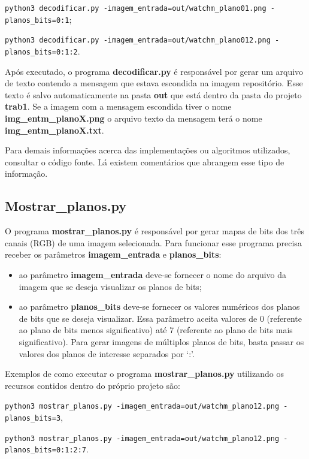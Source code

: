 \documentclass{article}
\begin{document}
\lstinline{python3 decodificar.py -imagem_entrada=out/watchm_plano01.png -planos_bits=0:1};

\lstinline{python3 decodificar.py -imagem_entrada=out/watchm_plano012.png -planos_bits=0:1:2}.

\noindent
Após executado, o programa \textbf{decodificar.py} é responsável por gerar um arquivo de texto contendo a mensagem que estava escondida na imagem repositório. Esse texto é salvo automaticamente na pasta \textbf{out} que está dentro da pasta do projeto \textbf{trab1}. Se a imagem com a mensagem escondida tiver o nome \textbf{img\_entm\_planoX.png} o arquivo texto da mensagem terá o nome \textbf{img\_entm\_planoX.txt}.

Para demais informações acerca das implementações ou algoritmos utilizados, consultar o código fonte. Lá existem comentários que abrangem esse tipo de informação.

%
\subsection{Mostrar\_planos.py}
O programa \textbf{mostrar\_planos.py} é responsável por gerar mapas de bits dos três canais (RGB) de uma imagem selecionada. Para funcionar esse programa precisa receber os parâmetros \textbf{imagem\_entrada} e \textbf{planos\_bits}:

\begin{itemize}
	\item ao parâmetro \textbf{imagem\_entrada} deve-se fornecer o nome do arquivo da imagem que se deseja visualizar os planos de bits;
	\item ao parâmetro \textbf{planos\_bits} deve-se fornecer os valores numéricos dos planos de bits que se deseja visualizar. Essa parâmetro aceita valores de 0 (referente ao plano de bits menos significativo) até 7 (referente ao plano de bits mais significativo). Para gerar imagens de múltiplos planos de bits, basta passar os valores dos planos de interesse separados por `:'.
\end{itemize}

\noindent
Exemplos de como executar o programa \textbf{mostrar\_planos.py} utilizando os recursos contidos dentro do próprio projeto são:

\lstinline{python3 mostrar_planos.py -imagem_entrada=out/watchm_plano12.png -planos_bits=3},

\lstinline{python3 mostrar_planos.py -imagem_entrada=out/watchm_plano12.png -planos_bits=0:1:2:7}.
\end{document}
